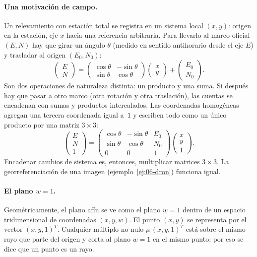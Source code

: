 \paragraph{Una motivación de campo.}
Un relevamiento con estación total se registra en un sistema local \((x,y)\): origen en la
estación, eje \(x\) hacia una referencia arbitraria. Para llevarlo al marco oficial
\((E,N)\) hay que girar un ángulo \(\theta\) (medido en sentido antihorario desde el eje
\(E\)) y trasladar al origen \((E_0,N_0)\):
\[
  \begin{pmatrix}E\\N\end{pmatrix}
  =
  \begin{pmatrix}\cos\theta&-\sin\theta\\ \sin\theta&\cos\theta\end{pmatrix}
  \begin{pmatrix}x\\y\end{pmatrix}
  +\begin{pmatrix}E_0\\N_0\end{pmatrix}.
\]
Son dos operaciones de naturaleza distinta: un producto y una suma. Si después hay que pasar
a otro marco (otra rotación y otra traslación), las cuentas se encadenan con sumas y
productos intercalados. Las coordenadas homogéneas agregan una tercera coordenada igual
a~\(1\) y escriben todo como un único producto por una matriz \(3\times3\):
\[
  \begin{pmatrix}E\\N\\1\end{pmatrix}
  =
  \begin{pmatrix}\cos\theta&-\sin\theta&E_0\\ \sin\theta&\cos\theta&N_0\\ 0&0&1\end{pmatrix}
  \begin{pmatrix}x\\y\\1\end{pmatrix}.
\]
Encadenar cambios de sistema es, entonces, multiplicar matrices \(3\times3\). La
georreferenciación de una imagen (ejemplo~\ref{ej:06-dron}) funciona igual.

\paragraph{El plano \(w=1\).}
Geométricamente, el plano afín se ve como el plano \(w=1\) dentro de un espacio
tridimensional de coordenadas \((x,y,w)\). El punto \((x,y)\) se representa por el vector
\((x,y,1)^T\). Cualquier múltiplo no nulo \(\mu\,(x,y,1)^T\) está sobre el mismo rayo que
parte del origen y corta al plano \(w=1\) en el mismo punto; por eso se dice que un punto es
un rayo.

